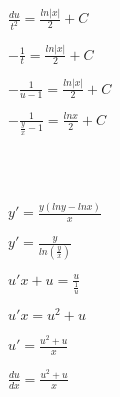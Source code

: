 \documentclass{article}
\begin{document}
\begin{flushleft}
   $\frac{du}{t^2} = \frac{ln|x|}{2} + C$
\end{flushleft}

\begin{flushleft}
    $-\frac{1}{t} = \frac{ln|x|}{2} + C$
\end{flushleft}

\begin{flushleft}
   $-\frac{1}{u - 1} = \frac{ln|x|}{2} + C$
\end{flushleft}

\begin{flushleft}
   $-\frac{1}{\frac{y}{x} - 1} = \frac{lnx}{2} + C$
\end{flushleft}

\begin{center}
    \\\\
\end{center}

\begin{center}
\end{center}

\begin{flushleft}
    $y' = \frac{y(lny - lnx)}{x}$
\end{flushleft}

\begin{center}
\end{center}

\begin{flushleft}
   $y' = \frac{y}{ln(\frac{y}{x})}$
\end{flushleft}

\begin{flushleft}
 $u'x + u = \frac{u}{\frac{1}{u}}$
\end{flushleft}

\begin{flushleft}
   $u'x = u^2 + u$
\end{flushleft}

\begin{flushleft}
    $u' = \frac{u^2 + u}{x}$
\end{flushleft}

\begin{flushleft}
   $\frac{du}{dx} = \frac{u^2 + u}{x}$
\end{flushleft}
\end{document}
